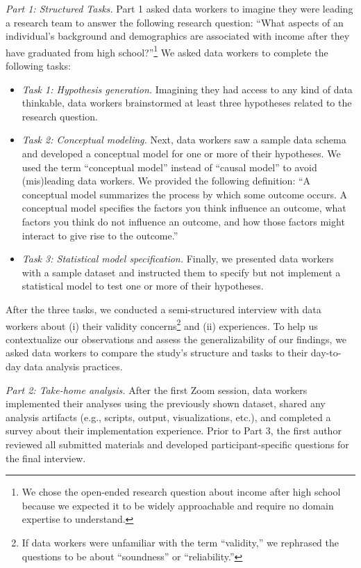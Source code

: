 \textit{Part 1: Structured Tasks.}  
Part 1 asked data workers to imagine they were leading a research team to answer
the following research question: ``What aspects of
an individual's background and demographics are associated with income after
they have graduated from high school?''\footnote{We chose the open-ended research
question about income after high school because we expected it to be widely
approachable and require no domain expertise to understand.}
We asked data workers to complete the following tasks:
\begin{itemize}
    \item \textit{Task 1: Hypothesis generation.} Imagining they had access to
    any kind of data thinkable, data workers brainstormed at least three
    hypotheses related to the research question.
    \item \textit{Task 2: Conceptual modeling.} Next, data workers saw a sample
    data schema and developed a conceptual model for one or more of their
    hypotheses. We used the term ``conceptual model'' instead of ``causal
    model'' to avoid (mis)leading data workers. We provided the following
    definition: ``A conceptual model summarizes the process by which some
    outcome occurs. A conceptual model specifies the factors you think influence
    an outcome, what factors you think do not influence an outcome, and how
    those factors might interact to give rise to the outcome.'' 
    \item \textit{Task 3: Statistical model specification.} Finally, we
    presented data workers with a sample dataset and instructed them to specify
    but not implement a statistical model to test one or more of their
    hypotheses. %
\end{itemize}

After the three tasks, we conducted a semi-structured interview with
data workers about (i) their validity concerns\footnote{If data workers were
unfamiliar with the term ``validity,'' we rephrased the questions to be about
``soundness'' or ``reliability.''} and (ii) experiences. To help us
contextualize our observations and assess the generalizability of our findings,
we asked data workers to compare the study's structure and tasks to their
day-to-day data analysis practices.

\textit{Part 2: Take-home analysis.} After the first Zoom session, data workers
implemented their analyses using the previously shown dataset, shared any
analysis artifacts (e.g., scripts, output, visualizations, etc.), and completed
a survey about their implementation experience. Prior to Part 3, the first
author reviewed all submitted materials and developed participant-specific
questions for the final interview.

